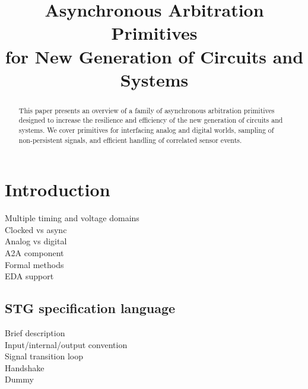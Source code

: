 \documentclass[conference]{IEEEtran}
\begin{document}
\title{Asynchronous Arbitration Primitives\\for New Generation of Circuits and Systems}

\author{
}

\maketitle

\begin{abstract}
This paper presents an overview of a family of asynchronous arbitration
primitives designed to increase the resilience and efficiency of
the new generation of circuits and systems. We cover primitives for
interfacing analog and digital worlds, sampling of non-persistent
signals, and efficient handling of correlated sensor events.
\end{abstract}


\section{Introduction}

Multiple timing and voltage domains\\
Clocked vs async\\
Analog vs digital\\
A2A component\\
Formal methods\\
EDA support\\

\subsection{STG specification language}

Brief description\\

Input/internal/output convention\\

Signal transition loop\\

Handshake\\

Dummy\\
\end{document}
